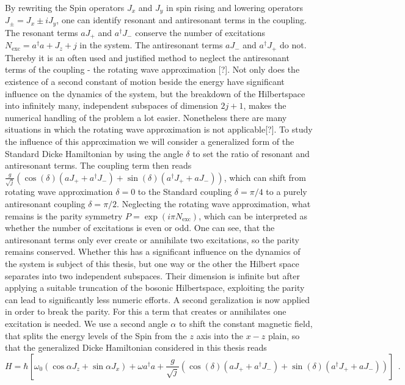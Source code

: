 By rewriting the Spin operators $J_x$ and $J_y$ in spin rising and lowering operators $J_\pm = J_x \pm i J_y$, one can identify resonant and antiresonant terms in the coupling.
The resonant terms $a J_+$ and $a^\dagger J_-$ conserve the number of excitations $N_\text{exc} = a^\dagger a + J_z + j$ in the system.
The antiresonant terms $a J_-$ and $a^\dagger J_+$ do not. 
Thereby it is an often used and justified method to neglect the antiresonant terms of the coupling - the rotating wave approximation [?].
Not only does the existence of a second constant of motion beside the energy have significant influence on the dynamics of the system, but the breakdown of the Hilbertspace into infinitely many, independent subspaces of dimension $2j+1$, makes the numerical handling of the problem a lot easier.
Nonetheless there are many situations in which the rotating wave approximation is not applicable[?].
To study the influence of this approximation we will consider a generalized form of the Standard Dicke Hamiltonian by using the angle $\delta$ to set the ratio of resonant and antiresonant terms.
The coupling term then reads $\frac{g}{\sqrt{j}}\left( \cos(\delta) (aJ_+ + a^\dagger J_-) +\sin(\delta) (a^\dagger J_+ +a J_-) \right)$, which can shift from rotating wave approximation $\delta = 0$ to the Standard coupling $\delta = \pi/4$ to a purely antiresonant coupling $\delta = \pi/2$.
Neglecting the rotating wave approximation, what remains is the parity symmetry $P = \exp(i\pi N_\text{exc})$, which can be interpreted as whether the number of excitations is even or odd.
One can see, that the antiresonant terms only ever create or annihilate two excitations, so the parity remains conserved.
Whether this has a significant influence on the dynamics of the system is subject of this thesis, but one way or the other the Hilbert space separates into two independent subspaces.
Their dimension is infinite but after applying a suitable truncation of the bosonic Hilbertspace, exploiting the parity can lead to significantly less numeric efforts.
A second geralization is now applied in order to break the parity.
For this a term that creates or annihilates one excitation is needed.
We use a second angle $\alpha$ to shift the constant magnetic field, that splits the energy levels of the Spin from the $z$ axis into the $x-z$ plain, so that the generalized Dicke Hamiltonian considered in this thesis reads
\begin{equation}
 H=\hbar \left[ \omega_0 (\cos\alpha J_z + \sin \alpha J_x )+\omega a^\dagger a + \frac{g}{\sqrt{j}}\left( \cos(\delta) (aJ_+ + a^\dagger J_-) +\sin(\delta) (a^\dagger J_+ +a J_-) \right) \right]~~. \label{eq:H}
\end{equation}

